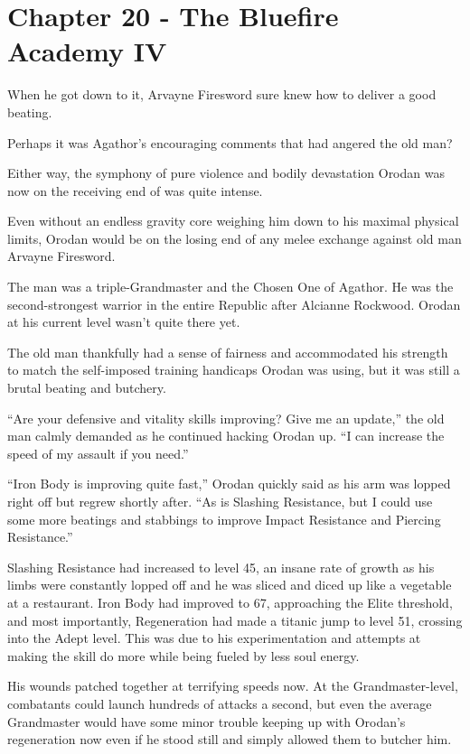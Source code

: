 \documentclass[a4paper,10pt]{book}
\begin{document}
\section*{Chapter 20 - The Bluefire Academy IV}
%
\par
When he got down to it, Arvayne Firesword sure knew how to deliver a good beating.\par
Perhaps it was Agathor’s encouraging comments that had angered the old man?\par
Either way, the symphony of pure violence and bodily devastation Orodan was now on the receiving end of was quite intense.\par
Even without an endless gravity core weighing him down to his maximal physical limits, Orodan would be on the losing end of any melee exchange against old man Arvayne Firesword.\par
The man was a triple-Grandmaster and the Chosen One of Agathor. He was the second-strongest warrior in the entire Republic after Alcianne Rockwood. Orodan at his current level wasn’t quite there yet.\par
The old man thankfully had a sense of fairness and accommodated his strength to match the self-imposed training handicaps Orodan was using, but it was still a brutal beating and butchery.\par
“Are your defensive and vitality skills improving? Give me an update,” the old man calmly demanded as he continued hacking Orodan up. “I can increase the speed of my assault if you need.”\par
“Iron Body is improving quite fast,” Orodan quickly said as his arm was lopped right off but regrew shortly after. “As is Slashing Resistance, but I could use some more beatings and stabbings to improve Impact Resistance and Piercing Resistance.”\par
Slashing Resistance had increased to level 45, an insane rate of growth as his limbs were constantly lopped off and he was sliced and diced up like a vegetable at a restaurant. Iron Body had improved to 67, approaching the Elite threshold, and most importantly, Regeneration had made a titanic jump to level 51, crossing into the Adept level. This was due to his experimentation and attempts at making the skill do more while being fueled by less soul energy.\par
His wounds patched together at terrifying speeds now. At the Grandmaster-level, combatants could launch hundreds of attacks a second, but even the average Grandmaster would have some minor trouble keeping up with Orodan’s regeneration now even if he stood still and simply allowed them to butcher him.\par
\end{document}
